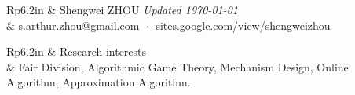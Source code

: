 \documentclass[letterpaper, 11pt]{article}
\newcommand{\headingfont}{\Large\color{OliveGreen}}
\newenvironment{SectionTable}[1]{
	\renewcommand*{\arraystretch}{1.2}
	\setlength{\tabcolsep}{8pt}
	\begin{longtable}{Rp{6.2in}} & #1 \\}
{\end{longtable}\vspace{-.7cm}}
\newenvironment{SectionTableSingleSpace}[1]{
	\renewcommand*{\arraystretch}{1.2}
	\setlength{\tabcolsep}{8pt}
	\begin{longtable}{Rp{6.2in}} & #1 \\[0.6em]}
{\end{longtable}\vspace{-.7cm}}
\begin{document}

\begin{SectionTable}{\Huge Shengwei ZHOU \hfill{\it\footnotesize Updated \today}} & 
\faEnvelope \; s.arthur.zhou@gmail.com   $\;\boldsymbol{\cdot}\;$ 
\faGlobe \; \href{https://sites.google.com/view/shengweizhou}{sites.google.com/view/shengweizhou} \newline
\end{SectionTable}


\begin{SectionTableSingleSpace}{\headingfont Research interests}
& Fair Division, Algorithmic Game Theory, Mechanism Design, Online Algorithm, \newline
Approximation Algorithm.
\end{SectionTableSingleSpace}

\end{document}

